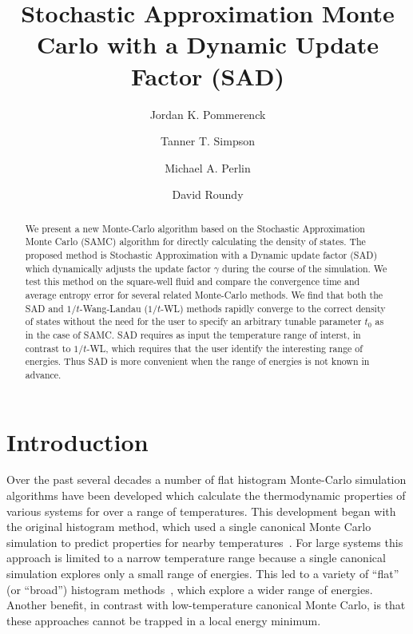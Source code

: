 \documentclass[letterpaper,twocolumn,amsmath,amssymb,pre,aps,10pt]{revtex4-1}
\begin{document}
\title{Stochastic Approximation Monte Carlo with a Dynamic Update
Factor (SAD)
}

\author{Jordan K. Pommerenck} \author{Tanner T. Simpson}
\author{Michael A. Perlin} \author{David Roundy}

\begin{abstract}
  We present a new Monte-Carlo algorithm based on the Stochastic
  Approximation Monte Carlo (SAMC) algorithm for directly calculating
  the density of states. The proposed method is Stochastic
  Approximation with a Dynamic update factor (SAD)
  which dynamically adjusts the update factor $\gamma$ during the course of
  the simulation. We test this method on the square-well fluid and
  compare the convergence time and average entropy error for several
  related
  Monte-Carlo methods. We find that both the SAD and $1/t$-Wang-Landau ($1/t$-WL)
  methods rapidly converge to the
  correct density of states without the need for the user to specify an
  arbitrary tunable parameter $t_0$ as in the case of SAMC.  SAD requires
  as input the temperature range of interst, in contrast to
  $1/t$-WL, which requires that the user identify the interesting range
  of energies.  Thus SAD is more convenient when the range of energies is
  not known in advance.
\end{abstract}

\maketitle

\section{Introduction}
Over the past several decades a number of flat histogram Monte-Carlo
simulation algorithms have been developed which calculate the
thermodynamic properties of various systems for over a range of temperatures.  This
development began with the original histogram method, which used a
single canonical Monte Carlo simulation to predict properties for
nearby temperatures~\cite{ferrenberg1988new}.  For large systems this
approach is limited to a narrow temperature range because a single
canonical simulation explores only a small range of energies.  This
led to a variety of ``flat'' (or ``broad'') histogram
methods~\cite{penna1996broad, penna1998broad, swendsen1999transition,
  wang2001determining, wang2001efficient, trebst2004optimizing}, which
explore a wider range of energies.  Another benefit, in
contrast with low-temperature canonical Monte Carlo, is that these
approaches cannot be trapped in a local energy minimum.
\end{document}

